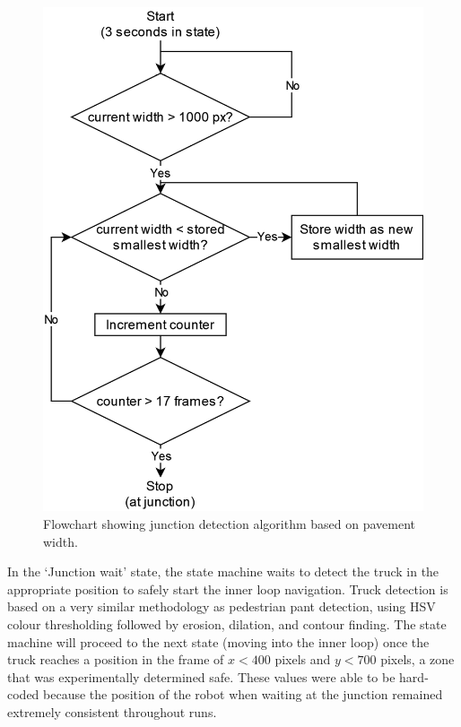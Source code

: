 \documentclass[titlepage, twocolumn]{article}
\begin{document}
            \begin{figure}
                \includegraphics[width=\linewidth]{junctiondiagram.png}
                \caption{Flowchart showing junction detection algorithm based on pavement width.}
                \label{fig:junctionalg}
            \end{figure}

            In the `Junction wait' state, the state machine waits to detect the truck in the appropriate position to safely start the inner loop navigation. Truck detection is based on a very similar methodology as pedestrian pant detection, using HSV colour thresholding followed by erosion, dilation, and contour finding. The state machine will proceed to the next state (moving into the inner loop) once the truck reaches a position in the frame of $x < 400$ pixels and $y<700 $ pixels, a zone that was experimentally determined safe. These values were able to be hard-coded because the position of the robot when waiting at the junction remained extremely consistent throughout runs. 
\end{document}

